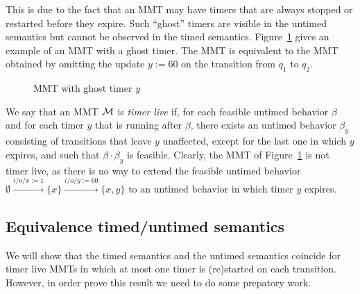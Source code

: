 This is due to the fact that an MMT may have timers that are always stopped or restarted before
they expire. Such ``ghost'' timers are visible in the untimed semantics but cannot be observed in the timed semantics.
\iflong
Figure~\ref{fig:ghosttimers} gives an example of an MMT with a ghost timer. The MMT is equivalent to the MMT obtained by 
omitting the update $y :=60$ on the transition from $q_1$ to $q_2$.
\begin{figure}
\begin{center}
\caption{MMT with ghost timer $y$}
\label{fig:ghosttimers}
\end{center}
\end{figure}
%
\fi
We say that an MMT ${\mathcal M}$ is \emph{timer live} if, for each feasible untimed behavior $\beta$ and for each timer $y$ that is running after $\beta$, there exists an untimed behavior $\beta_y$ consisting of transitions that leave $y$ unaffected, except for the last one in which $y$ expires, and such that $\beta \cdot \beta_y$ is feasible.
\iflong
Clearly, the MMT of Figure~\ref{fig:ghosttimers} is not timer live, as there is no way to extend the feasible untimed
behavior $\emptyset \xrightarrow{i/o/x:=1 } \{ x\} \xrightarrow{i/o/y:=60 } \{ x, y\}$ to an untimed behavior in which
timer $y$ expires.
\fi



\subsection{Equivalence timed/untimed semantics}
\label{sec:wiggling}
We will show that the timed semantics and the untimed semantics coincide for timer live MMTs in which at most one timer is (re)started on each transition. However, in order prove this result we need to do some prepatory work.

